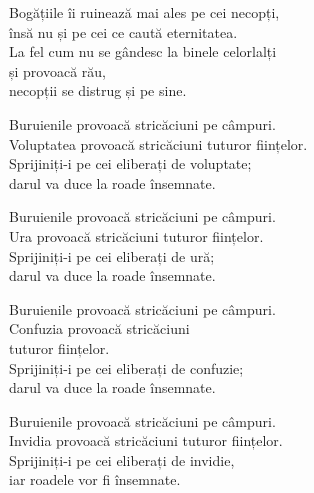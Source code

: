 Bogățiile îi ruinează mai ales pe cei necopți,\\
însă nu și pe cei ce caută eternitatea.\\
La fel cum nu se gândesc la binele celorlalți\\
și provoacă rău,\\
necopții se distrug și pe sine.


Buruienile provoacă stricăciuni pe câmpuri.\\
Voluptatea provoacă stricăciuni tuturor ființelor.\\
Sprijiniți-i pe cei eliberați de voluptate;\\
darul va duce la roade însemnate.


Buruienile provoacă stricăciuni pe câmpuri.\\
Ura provoacă stricăciuni tuturor ființelor.\\
Sprijiniți-i pe cei eliberați de ură;\\
darul va duce la roade însemnate.


Buruienile provoacă stricăciuni pe câmpuri.\\
Confuzia provoacă stricăciuni\\
tuturor ființelor.\\
Sprijiniți-i pe cei eliberați de confuzie;\\
darul va duce la roade însemnate.


Buruienile provoacă stricăciuni pe câmpuri.\\
Invidia provoacă stricăciuni tuturor ființelor.\\
Sprijiniți-i pe cei eliberați de invidie,\\
iar roadele vor fi însemnate.
